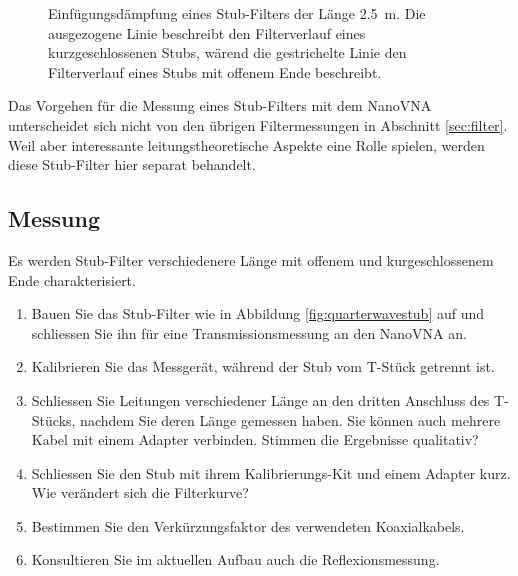 \documentclass[twoside,a4paper,11pt,halfparskip,DIV=11,notitlepage]{scrartcl}
\begin{document}
\begin{figure}[H]
\begin{center}
\end{center}
\caption{Einfügungsdämpfung eines Stub-Filters der Länge 2.5~m. Die ausgezogene Linie beschreibt den Filterverlauf
eines kurzgeschlossenen Stubs, wärend die gestrichelte Linie den Filterverlauf eines Stubs mit offenem Ende beschreibt.}
\label{fig:quarterwaveplot}
\end{figure}

Das Vorgehen für die Messung eines Stub-Filters mit dem NanoVNA unterscheidet
sich nicht von den übrigen Filtermessungen in Abschnitt \ref{sec:filter}. Weil
aber interessante leitungstheoretische Aspekte eine Rolle spielen, werden diese
Stub-Filter hier separat behandelt.

\subsection{Messung}

Es werden Stub-Filter verschiedenere Länge mit offenem und kurgeschlossenem Ende charakterisiert.

\begin{enumerate}
    \item Bauen Sie das Stub-Filter wie in Abbildung \ref{fig:quarterwavestub} auf und schliessen Sie ihn für eine
        Transmissionsmessung an den NanoVNA an.
    \item Kalibrieren Sie das Messgerät, während der Stub vom T-Stück getrennt ist.
    \item Schliessen Sie Leitungen verschiedener Länge an den dritten Anschluss des T-Stücks, nachdem Sie deren
        Länge gemessen haben. Sie können auch mehrere Kabel mit einem Adapter verbinden. Stimmen die Ergebnisse qualitativ?
    \item Schliessen Sie den Stub mit ihrem Kalibrierungs-Kit und einem Adapter kurz. Wie verändert sich die Filterkurve?
    \item Bestimmen Sie den Verkürzungsfaktor des verwendeten Koaxialkabels.
    \item Konsultieren Sie im aktuellen Aufbau auch die Reflexionsmessung.
\end{enumerate}
\end{document}
